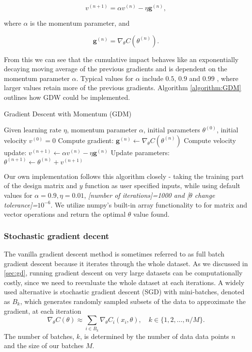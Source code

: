 \documentclass[amssymb,twocolumn,aps]{revtex4}
\begin{document}
$$v^{(n+1)} = \alpha v^{(n)} - \eta \boldsymbol{g}^{(n)},$$

where $\alpha$ is the momentum parameter, and

$$\boldsymbol{g}^{(n)} = \nabla_\theta C(\theta^{(n)}).$$

From this we can see that the cumulative impact behaves like an exponentially decaying moving average of the previous gradients and is dependent on the momentum parameter $\alpha$. Typical values for $\alpha$ include $0.5$, $0.9$ and $0.99$ \cite{Goodfellow-et-al-2016}, where larger values retain more of the previous gradients. Algorithm \ref{algorithm:GDM} outlines how GDW could be implemented.

\begin{algorithm}[H]
    \caption{Gradient Descent with Momentum (GDM)}
    \label{algorithm:GDM}
    \begin{algorithmic}[1]
        \State Given learning rate $\eta$, momentum parameter $\alpha$, initial parameters $\theta^{(0)}$, initial velocity $v^{(0)} = 0$
        \State Compute gradient: $\boldsymbol{g}^{(n)} \leftarrow \nabla_\theta C(\theta^{(n)})$
        \State Compute velocity update: $v^{(n+1)} \leftarrow \alpha v^{(n)} - \eta \boldsymbol{g}^{(n)}$
        \State Update parameters: $\theta^{(n+1)} \leftarrow \theta^{(n)} + v^{(n+1)}$
        \EndWhile
    \end{algorithmic}
\end{algorithm}

Our own implementation follows this algorithm closely - taking the training part of the design matrix and $y$ function as user specified inputs, while using default values for $\alpha=0.9, \eta=0.01$, \textit{[number of iterations]=1000 and [$\theta$ change tolerance]=$10^{-6}$}. We utilize numpy's \cite{2020NumPy-Array} built-in array functionality to for matrix and vector operations and return the optimal $\theta$ value found.


\subsubsection{Stochastic gradient decent}


The vanilla gradient descent method is sometimes referred to as full batch gradient descent because it iterates through the whole dataset. As we discussed in \autoref{sec:gd}, running gradient descent on very large datasets can be computationally costly, since we need to reevaluate the whole dataset at each iterations. A widely used  alternative is stochastic gradient descent (SGD) with mini-batches, denoted as $B_k$, which generates randomly sampled subsets of the data to approximate the gradient, at each iteration $$ \nabla_\theta C(\theta) \approx \sum_{i\in B_k} \nabla_\theta C_i (x_i,\theta), \quad k\in\{1,2, \dots , n/M\}.$$
The number of batches, $k$, is determined by the number of data data points $n$  and the size of our batches $M$.
\end{document}
